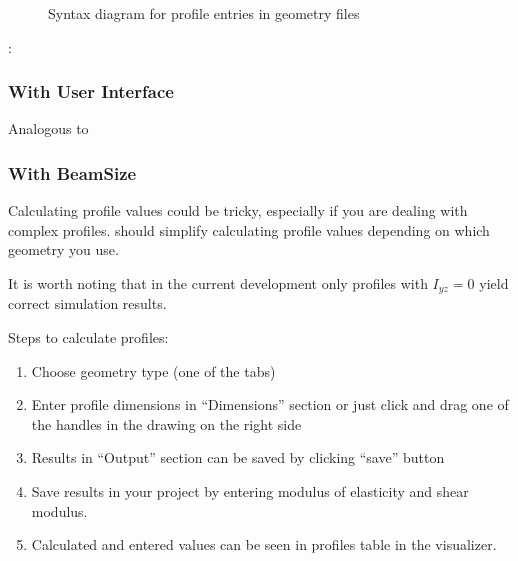 \documentclass[letterpaper,10pt,english]{sphinxmanual}
\begin{document}
\begin{figure}[htbp]
\centering
\capstart

\noindent{}
\caption{Syntax diagram for profile entries in geometry files}\label{\detokenize{making_a_model:id27}}\end{figure}

:

\begin{sphinxVerbatim}[commandchars=\\\{\}]
\end{sphinxVerbatim}


\subsubsection{With User Interface}
\label{\detokenize{making_a_model:id20}}
Analogous to {\hyperref[\detokenize{making_a_model:nodes-input}]{}}


\subsubsection{With BeamSize}
\label{\detokenize{making_a_model:with-beamsize}}
Calculating profile values could be tricky, especially if you are dealing with complex profiles.
 should simplify calculating profile values depending on which geometry you use.

It is worth noting that in the current development only profiles with \(I_{yz}=0\) yield correct simulation results.

Steps to calculate profiles:
\begin{enumerate}
%
\item {} 
Choose geometry type (one of the tabs)

\item {} 
Enter profile dimensions in “Dimensions” section or just click and drag one of the handles in the drawing on the right side

\item {} 
Results in “Output” section can be saved by clicking “save” button

\item {} 
Save results in your project by entering modulus of elasticity and shear modulus.

\item {} 
Calculated and entered values can be seen in profiles table in the visualizer.

\end{enumerate}
\end{document}
